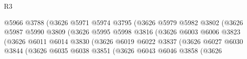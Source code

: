 \begin{lexlean}{R3}
\begin{coremodule}
                                            @5966
                                            @3788
                                            (@3626
                                              @5971
                                              @5974
                                              @3795
                                              (@3626
                                                @5979
                                                @5982
                                                @3802
                                                (@3626
                                                  @5987
                                                  @5990
                                                  @3809
                                                  (@3626
                                                    @5995
                                                    @5998
                                                    @3816
                                                    (@3626
                                                      @6003
                                                      @6006
                                                      @3823
                                                      (@3626
                                                        @6011
                                                        @6014
                                                        @3830
                                                        (@3626
                                                          @6019
                                                          @6022
                                                          @3837
                                                          (@3626
                                                            @6027
                                                            @6030
                                                            @3844
                                                            (@3626
                                                              @6035
                                                              @6038
                                                              @3851
                                                              (@3626
                                                                @6043
                                                                @6046
                                                                @3858
                                                                (@3626

\end{coremodule}
\end{lexlean}
